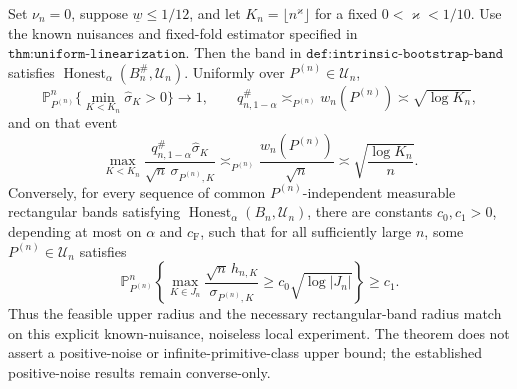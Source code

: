 Set \(\nu_n=0\), suppose \(\underline w\leq1/12\), and let \(K_n=\lfloor n^\varkappa\rfloor\) for a fixed \(0<\varkappa<1/10\).  Use the known nuisances and fixed-fold estimator specified in \(\texttt{thm:uniform-linearization}\).  Then the band in \(\texttt{def:intrinsic-bootstrap-band}\) satisfies \(\operatorname{Honest}_{\alpha}(B_n^{\#},\mathcal U_n)\).  Uniformly over \(P^{(n)}\in\mathcal U_n\),
\[
 \mathbb P_{P^{(n)}}^n\{\min_{K<K_n}\widehat\sigma_K>0\}\longrightarrow1,
 \qquad
 q_{n,1-\alpha}^{\#}\asymp_{P^{(n)}}w_n(P^{(n)})\asymp\sqrt{\log K_n},
\]
and on that event
\[
 \max_{K<K_n}\frac{q_{n,1-\alpha}^{\#}\widehat\sigma_K}{\sqrt n\,\sigma_{P^{(n)},K}}
 \asymp_{P^{(n)}}\frac{w_n(P^{(n)})}{\sqrt n}
 \asymp\sqrt{\frac{\log K_n}{n}}.
\]
Conversely, for every sequence of common \(P^{(n)}\)-independent measurable rectangular bands satisfying \(\operatorname{Honest}_{\alpha}(B_n,\mathcal U_n)\), there are constants \(c_0,c_1>0\), depending at most on \(\alpha\) and \(c_{\mathrm F}\), such that for all sufficiently large \(n\), some \(P^{(n)}\in\mathcal U_n\) satisfies
\[
 \mathbb P_{P^{(n)}}^n\left\{\max_{K\in J_n}
 \frac{\sqrt n\,h_{n,K}}{\sigma_{P^{(n)},K}}
 \geq c_0\sqrt{\log|J_n|}\right\}\geq c_1.
\]
Thus the feasible upper radius and the necessary rectangular-band radius match on this explicit known-nuisance, noiseless local experiment.  The theorem does not assert a positive-noise or infinite-primitive-class upper bound; the established positive-noise results remain converse-only.